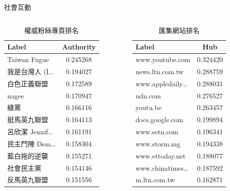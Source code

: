 \documentclass{beamer}
\begin{document}
\begin{CJK}{UTF8}{bkai}
\begin{frame}{社會互動}
\begin{columns}
\begin{column}{.48\textwidth}
  \begin{table}
  \caption{權威粉絲專頁排名}
  \begin{tabular}{@{}lc@{}}
    \toprule
    Label & Authority \\
    \midrule
    Taiwan Fugue & 0.245268 \\
    我是台灣人 (I\dots & 0.194027 \\
    白色正義聯盟 & 0.172589 \\
    nagee & 0.170947 \\
    綠黨 & 0.166116 \\
    挺馬英九聯盟 & 0.164113 \\
    呂欣潔 Jennif\dots & 0.161191 \\
    民主鬥陣 Dem\dots & 0.158304 \\
    藍白拖的逆襲 & 0.155271 \\
    社會民主黨 & 0.154146 \\
    反馬英九聯盟 & 0.151556 \\
    \bottomrule
  \end{tabular}
  \end{table}
\end{column}
\begin{column}{.48\textwidth}
  \begin{table}
  \caption{匯集網站排名}
  \begin{tabular}{@{}lc@{}}
    \toprule
    Label & Hub \\
    \midrule
    www.youtube.com & 0.324420 \\
    news.ltn.com.tw & 0.288759 \\
    www.appledaily\dots & 0.288031 \\
    udn.com & 0.276527 \\
    youtu.be & 0.263457 \\
    docs.google.com & 0.199894 \\
    www.setn.com & 0.196341 \\
    www.storm.mg & 0.194338 \\
    www.ettoday.net & 0.188077 \\
    www.chinatimes\dots & 0.187592 \\
    m.ltn.com.tw & 0.162871 \\
    \bottomrule
  \end{tabular}
  \end{table}
\end{column}
\end{columns}
\end{frame}


\end{CJK}
\end{document}
